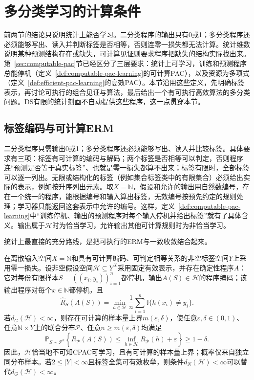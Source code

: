 \section{多分类学习的计算条件}
\label{sec:computable-multiclass-learning}

前两节的结论只说明统计上能否学习。二分类程序的输出只有0或1；多分类程序还必须能够写出、读入并判断标签是否相等，否则连零一损失都无法计算。统计维数说明某种预测结构存在或缺失，可计算见证则要求程序把缺失的结构实际找出来。第~\ref{sec:computable-pac}节已经区分了三层要求：统计上可学习，训练和预测程序总能停机（定义~\ref{def:computable-pac-learning}的可计算PAC），以及资源为多项式（定义~\ref{def:efficient-pac-learning}的高效PAC）。本节沿用这些定义，先明确标签表示，再讨论可执行的组合见证与算法，最后给出一个有可执行高效算法的多分类问题。DS有限的统计刻画不自动提供这些程序，这一点贯穿本节。

\subsection{标签编码与可计算ERM}
\label{sec:lt6-computable-erm}

二分类程序只需输出0或1；多分类程序还必须能够写出、读入并比较标签。具体要求有三项：标签有可计算的编码与解码；两个标签是否相等可以判定，否则程序连“预测是否等于真实标签”、也就是零一损失都算不出来；标签有限时，全部标签可以逐一列出。无限或结构化的标签（例如集合标签类中的有限集合）必须给出实际的表示，例如按升序列出元素。取$X=\mathbb N$，假设和允许的输出用自然数编号，存在一个统一的程序，能根据编号和输入算出标签，无效编号按预先约定的规则处理；学习器只能返回这套表示中允许的编号。这样，定义~\ref{def:computable-pac-learning}中“训练停机、输出的预测程序对每个输入停机并给出标签”就有了具体含义。输出属于$\mathcal H$时为恰当学习，允许输出其他可计算规则时为非恰当学习。

统计上最直接的充分路线，是把可执行的ERM与一致收敛结合起来。

\begin{theorem}[多分类可计算ERM的充分条件]
\label{thm:multiclass-computable-erm}
在离散输入空间$X=\mathbb N$和具有可计算编码、可判定相等关系的非空标签空间$Y$上采用零一损失。设非空假设空间$\mathcal H\subseteq Y^X$采用固定有效表示，并存在确定性程序$A$：它对每份有限样本$S=((x_i,y_i))_{i=1}^n$都停机，输出$A(S)\in\mathcal H$的程序编码；该输出程序对每个$x\in\mathbb N$都停机，且
\[
 \hat R_S(A(S))
 =\min_{h\in\mathcal H}\frac1n\sum_{i=1}^n\mathbb I\{h(x_i)\neq y_i\}.
\]
若$d_G(\mathcal H)<\infty$，则存在可计算的样本量上界$m(\varepsilon,\delta)$，使任意$\varepsilon,\delta\in(0,1)$、任意$\mathbb N\times Y$上的联合分布$\mathcal P$、任意$n\geq m(\varepsilon,\delta)$均满足
\[
 \mathbb P_{S\sim\mathcal P^n}\left\{
 R_{\mathcal P}(A(S))
 \leq\inf_{h\in\mathcal H}R_{\mathcal P}(h)+\varepsilon
 \right\}\geq1-\delta.
\]
因此，$\mathcal H$恰当地不可知CPAC可学习，且有可计算的样本量上界；概率仅来自独立同分布样本。若$2\leq|Y|<\infty$且标签全集可有效枚举，则条件$d_N(\mathcal H)<\infty$可以替代$d_G(\mathcal H)<\infty$。
\end{theorem}

